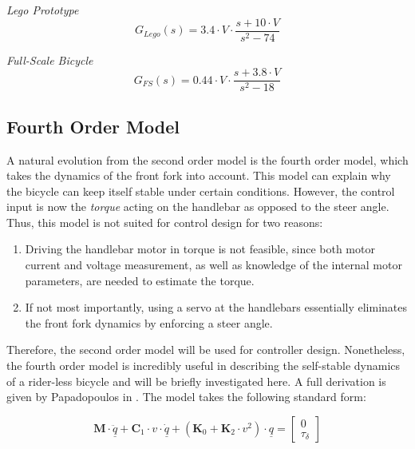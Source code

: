 \textit{Lego Prototype}
\begin{equation}
G_{Lego}(s) = 3.4 \cdot V \cdot \frac{s + 10 \cdot V}{s^2 - 74}
\label{eq:2ndOrderLego}
\end{equation}

\textit{Full-Scale Bicycle}
\begin{equation}
G_{FS}(s) = 0.44 \cdot V \cdot \frac{s + 3.8 \cdot V}{s^2 - 18}
\label{eq:2ndOrderFS}
\end{equation}

\subsection{Fourth Order Model} \label{FourthOrder}
A natural evolution from the second order model is the fourth order model, which takes the dynamics of the front fork into account. This model can explain why the bicycle can keep itself stable under certain conditions. However, the control input is now the \textit{torque} acting on the handlebar as opposed to the steer angle. Thus, this model is not suited for control design for two reasons: 

\begin{enumerate}
\item{Driving the handlebar motor in torque is not feasible, since both motor current and voltage measurement, as well as knowledge of the internal motor parameters, are needed to estimate the torque.}
\item{If not most importantly, using a servo at the handlebars essentially eliminates the front fork dynamics by enforcing a steer angle.}
\end{enumerate}

Therefore, the second order model will be used for controller design. Nonetheless, the fourth order model is incredibly useful in describing the self-stable dynamics of a rider-less bicycle and will be briefly investigated here. A full derivation is given by Papadopoulos in \cite{fourthorder}. The model takes the following standard form:

\begin{equation*}
\mathbf{M} \cdot \underline{\ddot{q}} + \mathbf{C}_1 \cdot v \cdot \underline{\dot{q}} + (\mathbf{K}_0 + \mathbf{K}_2 \cdot v^2) \cdot \underline{q} = \begin{bmatrix}
0 \\ \tau_{\delta}
\end{bmatrix}
\end{equation*}

